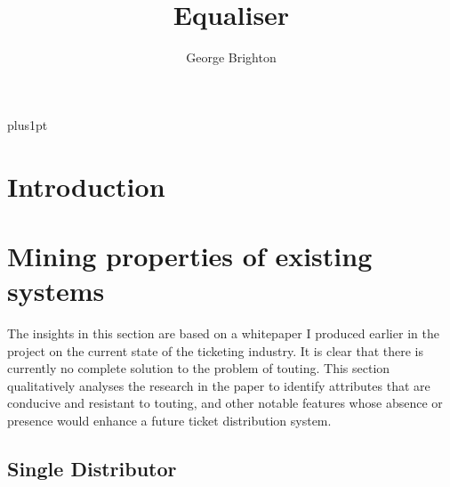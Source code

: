 \documentclass[12pt,a4]{bhamdissertation}
\title{Equaliser}
\author{George Brighton}             %
\begin{document}
\baselineskip=18pt plus1pt

\setcounter{secnumdepth}{3}
\setcounter{tocdepth}{1}

\maketitle                  %

\begin{romanpages}          %

\tableofcontents

\cleardoublepage{}
\begin{abstract}
\lipsum[1-1] %
\end{abstract}

\cleardoublepage{}
\begin{acknowledgements}
\lipsum[2-2] %
\end{acknowledgements}

\end{romanpages}            %

\chapter{Introduction}

\chapter{Mining properties of existing systems}

The insights in this section are based on a whitepaper \autocite{B17} I produced earlier in the project on the current state of the ticketing industry. It is clear that there is currently no complete solution to the problem of touting. This section qualitatively analyses the research in the paper to identify attributes that are conducive and resistant to touting, and other notable features whose absence or presence would enhance a future ticket distribution system.

\section{Single Distributor}
\end{document}
